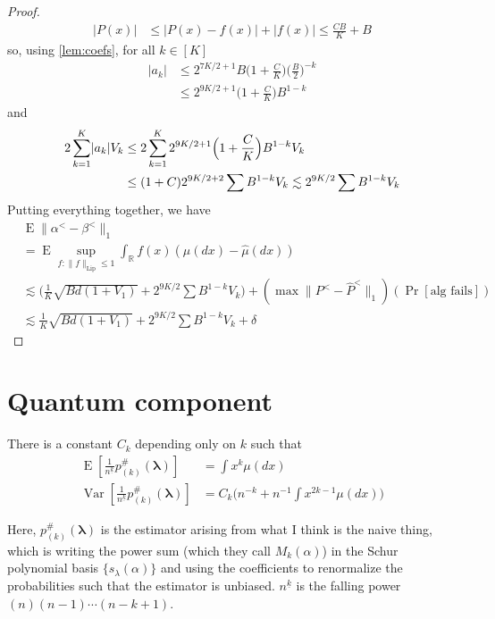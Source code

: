\documentclass{article}
\theoremstyle{definition}
\DeclareMathOperator{\E}{E}
\DeclareMathOperator{\Var}{Var}
\DeclarePairedDelimiter{\abs}{\lvert}{\rvert}
\begin{document}
\begin{proof}
\begin{align*}
    |P(x)| &\leq |P(x) - f(x)| + |f(x)|
    \leq \frac{CB}{K} + B
\end{align*}
so, using \cref{lem:coefs}, for all $k \in [K]$
\begin{align*}
    |a_k| &\leq 2^{7K/2 + 1}B\Big(1 + \frac CK\Big)\Big(\frac{B}{2}\Big)^{-k} \\
    &\leq 2^{9K/2 + 1}\Big(1 + \frac CK\Big)B^{1-k}
\end{align*}
and
\begin{align*}
    2\sum_{k=1}^K \abs{a_k}V_k
    &\leq 2\sum_{k=1}^K 2^{9K/2 + 1}\Big(1 + \frac CK\Big)B^{1-k}V_k \\
    &\leq (1+C)2^{9K/2 + 2}\sum B^{1-k}V_k
    \lesssim 2^{9K/2}\sum B^{1-k}V_k
\end{align*}
Putting everything together, we have
\begin{align*}
    &\E \|\alpha^< - \beta^<\|_1 \\
    &=\E \sup_{f : \|f\|_{\text{Lip}} \leq 1} \int_{\mathbb{R}}f(x)(\mu(dx) - \hat{\mu}(dx)) \\
    &\lesssim \Big(\frac1K\sqrt{Bd(1+V_1)} +  2^{9K/2}\sum B^{1-k}V_k\Big) + (\max \|P^< - \hat{P}^<\|_1)(\Pr[\text{alg fails}]) \\
    &\lesssim \frac1K\sqrt{Bd(1+V_1)} +  2^{9K/2}\sum B^{1-k}V_k + \delta
\end{align*}
\end{proof}

\section{Quantum component}

\begin{lemma}
    There is a constant $C_k$ depending only on $k$ such that
    \begin{align}
        \E[\frac{1}{n^{\underline{k}}}p_{(k)}^{\#}(\bm{\lambda})] &= \int x^k\mu(dx) \\
        \Var[\frac{1}{n^{\underline{k}}}p_{(k)}^{\#}(\bm{\lambda})] &= C_k\Big(n^{-k} + n^{-1}\int x^{2k-1}\mu(dx)\Big)
    \end{align}
\end{lemma}

Here, $p_{(k)}^\#(\bm{\lambda})$ is the estimator arising from what I think is the naive thing, which is writing the power sum (which they call $M_k(\alpha)$) in the Schur polynomial basis $\{s_\lambda(\alpha)\}$ and using the coefficients to renormalize the probabilities such that the estimator is unbiased. $n^{\underline{k}}$ is the falling power $(n)(n-1)\cdots(n-k+1)$.
\end{document}

